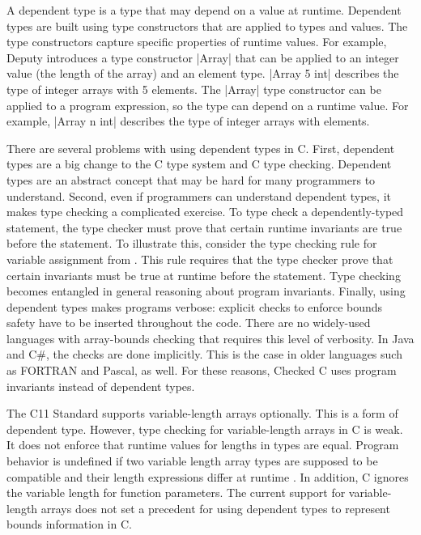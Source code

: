 A dependent type is a type that may depend on a value at runtime.
Dependent types are built using type constructors that are applied to
types and values. The type constructors capture specific properties of
runtime values. For example, Deputy introduces a type constructor
\code|Array| that can be applied to an integer value (the length of the
array) and an element type. \code|Array 5 int| describes the type of
integer arrays with 5 elements. The \code|Array| type constructor can be
applied to a program expression, so the type can depend
on a runtime value. For example, \code|Array n int| describes the type
of integer arrays with  elements.

There are several problems with using dependent types in C.
First, dependent types are a big change to the
C type system and C type checking. Dependent types are an abstract
concept that may be hard for many programmers to understand. 
Second, even if
programmers can understand dependent types, it makes type checking a
complicated exercise.  To type check a dependently-typed statement, the
type checker must prove that certain runtime invariants are true before
the statement. To illustrate this, consider the type checking rule for
variable assignment from \cite{Condit2007}. This
rule requires that the type checker prove that certain invariants must
be true at runtime before the statement. Type checking becomes entangled
in general reasoning about program invariants.
Finally, using dependent types makes programs verbose: explicit
checks to enforce bounds safety have to be inserted throughout the code. There
are no widely-used languages with array-bounds checking
that requires this level of verbosity. In Java and C\#, the checks are
done implicitly. This is the case in older languages such as FORTRAN
and Pascal, as well.  For these reasons, Checked C uses program invariants
instead of dependent types.

The C11 Standard supports variable-length arrays optionally.  This is a
form of dependent type.  However, type checking for variable-length arrays
in C is weak.  It does not enforce that runtime 
values for lengths in types are equal. Program behavior is undefined if two variable 
length array types are supposed to be compatible and their length expressions differ at
runtime \cite[Section 6.7.6.2]{ISO2011}. In addition, C ignores the variable length 
for function
parameters.  The current support for variable-length arrays does not set a precedent 
for using dependent types to represent bounds information in C.

